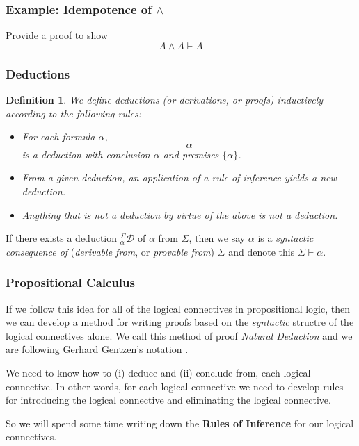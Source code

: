 \documentclass{beamer}
\theoremstyle{indentDefn} \newtheorem{defn}[]{Definition}
\begin{document}
\begin{frame}
	\frametitle{Example: Idempotence of $\land$}
	
	Provide a proof to show $$A \land A \vdash A$$
	
	\vspace{6cm}
	
\end{frame}

\begin{frame}
	\frametitle{Deductions}
	
	\begin{defn} We define deductions (or derivations, or proofs) inductively according to the following rules: 
	
	\begin{itemize}
		\item For each formula $\alpha$,
		$$ \alpha $$
		is a deduction with conclusion $\alpha$ and premises $\{\alpha\}$.
		
		\item From a given deduction, an application of a \textit{rule of inference} yields a new deduction.
		
		\item Anything that is not a deduction by virtue of the above is \emph{not} a deduction. 
	\end{itemize}

	\end{defn}
	
	\vspace{0.3cm}

	If there exists a deduction $^\Sigma_{\alpha}\mathcal{D}$ of $\alpha$ from $\Sigma$, then we say $\alpha$ is a \textit{syntactic consequence of }(\textit{derivable from}, or \textit{provable from}) $\Sigma$ and denote this $\Sigma \vdash \alpha$. 
	
	
\end{frame}

\begin{frame}
	\frametitle{Propositional Calculus}
	
	If we follow this idea for all of the logical connectives in propositional logic, then we can develop a method for writing proofs based on the \textit{syntactic} structre of the logical connectives alone. We call this method of proof \emph{Natural Deduction} and we are following Gerhard Gentzen's notation \cite{vDalen,thompson}.
	
	\vspace{0.3cm}
	
	We need to know how to (i) deduce and (ii) conclude from, each logical connective. In other words, for each logical connective we need to develop rules for introducing the logical connective and eliminating the logical connective.
	
	\vspace{0.3cm}
	
	So we will spend some time writing down the {\bf Rules of Inference} for our logical connectives. 
	
\end{frame}
\end{document}
